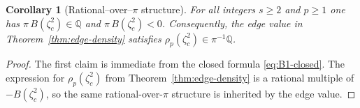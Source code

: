 \documentclass[11pt]{amsart}
\numberwithin{equation}{section}
\theoremstyle{plain}
\newtheorem{corollary}[theorem]{Corollary}
\theoremstyle{definition}
\theoremstyle{remark}
\newcommand{\QQ}{\mathbb{Q}}
\begin{document}
\begin{corollary}[Rational--over--$\pi$ structure]\label{cor:B1-rational}
	For all integers $s\ge2$ and $p\ge1$ one has $\pi\,B(\zeta_c^2)\in\QQ$ and $\pi\,B(\zeta_c^2)<0$.
	Consequently, the edge value in Theorem~\ref{thm:edge-density} satisfies
	$\rho_p(\zeta_c^2)\in\pi^{-1}\QQ$.
\end{corollary}


\begin{proof}
	The first claim is immediate from the closed formula \eqref{eq:B1-closed}. The
	expression for $\rho_p(\zeta_c^2)$ from Theorem~\ref{thm:edge-density} is a
	rational multiple of $-B(\zeta_c^2)$, so the same rational-over-$\pi$
	structure is inherited by the edge value.
\end{proof}



\end{document}
